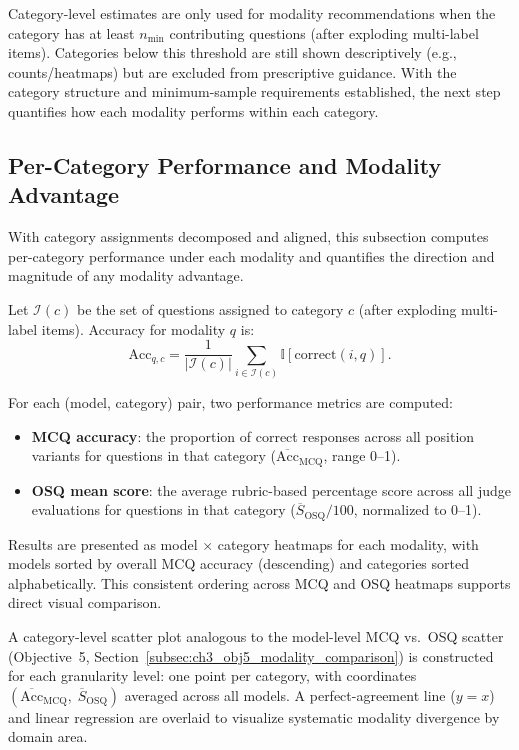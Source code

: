 Category-level estimates are only used for modality recommendations when the category has at least $n_{\min}$ contributing questions (after exploding multi-label items). Categories below this threshold are still shown descriptively (e.g., counts/heatmaps) but are excluded from prescriptive guidance. With the category structure and minimum-sample requirements established, the next step quantifies how each modality performs within each category.


\subsection{Per-Category Performance and Modality Advantage}
\label{subsec:ch3_obj7_performance}

With category assignments decomposed and aligned, this subsection computes per-category performance under each modality and quantifies the direction and magnitude of any modality advantage.

Let $\mathcal{I}(c)$ be the set of questions assigned to category $c$ (after exploding multi-label items). Accuracy for modality $q$ is:
\[
\text{Acc}_{q,c}=\frac{1}{|\mathcal{I}(c)|}\sum_{i\in \mathcal{I}(c)} \mathbb{I}[\text{correct}(i,q)].
\]

For each (model, category) pair, two performance metrics are computed:

\begin{itemize}[nosep]
    \item \textbf{MCQ accuracy}: the proportion of correct responses across all position variants for questions in that category ($\overline{\text{Acc}}_{\text{MCQ}}$, range 0--1).
    \item \textbf{OSQ mean score}: the average rubric-based percentage score across all judge evaluations for questions in that category ($\overline{S}_{\text{OSQ}} / 100$, normalized to 0--1).
\end{itemize}

Results are presented as model $\times$ category heatmaps for each modality, with models sorted by overall MCQ accuracy (descending) and categories sorted alphabetically. This consistent ordering across MCQ and OSQ heatmaps supports direct visual comparison.

A category-level scatter plot analogous to the model-level MCQ vs.\ OSQ scatter (Objective~5, Section~\ref{subsec:ch3_obj5_modality_comparison}) is constructed for each granularity level: one point per category, with coordinates $(\overline{\text{Acc}}_{\text{MCQ}},\; \overline{S}_{\text{OSQ}})$ averaged across all models. A perfect-agreement line ($y = x$) and linear regression are overlaid to visualize systematic modality divergence by domain area.

